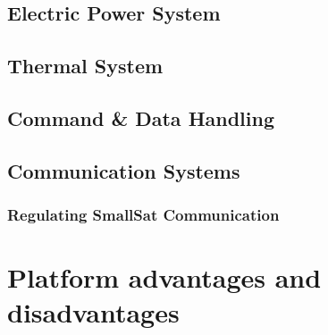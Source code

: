 {\small\textit{\lipsum[1-2]}}

\subsection{Electric Power System}
\label{subsec:Power}

{\small\textit{\lipsum[1-2]}}

\subsection{Thermal System}
\label{subsec:Thermal}

{\small\textit{\lipsum[1-2]}}

\subsection{Command \& Data Handling}
\label{subsec:C_DH}

{\small\textit{\lipsum[1-2]}}

\subsection{Communication Systems}
\label{subsec:Comm}

{\small\textit{\lipsum[1-2]}}

\subsubsection{Regulating SmallSat Communication}
\label{subsec:Reg_Comm}

{\small\textit{\lipsum[1-2]}}


\section{Platform advantages and disadvantages}
\label{sec:SmallSat_AdvantDisadvanteges}

{\small\textit{\lipsum[1-2]}}


